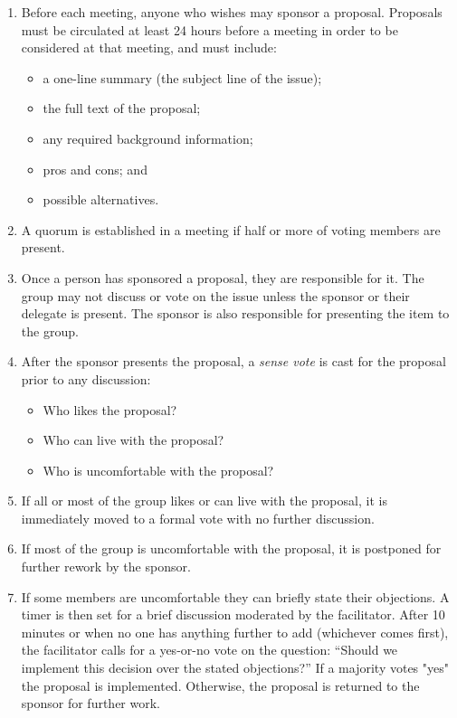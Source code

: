 \documentclass[10pt,letterpaper]{article}
\begin{document}
\begin{enumerate}

\item
  Before each meeting, anyone who wishes may sponsor a proposal.  Proposals must
  be circulated at least 24 hours before a meeting in order to be considered at
  that meeting, and must include:

  \begin{itemize}
  \item a one-line summary (the subject line of the issue);
  \item the full text of the proposal;
  \item any required background information;
  \item pros and cons; and
  \item possible alternatives.
  \end{itemize}

\item
  A quorum is established in a meeting if half or more of voting members are
  present.

\item
  Once a person has sponsored a proposal, they are responsible for it.  The
  group may not discuss or vote on the issue unless the sponsor or their
  delegate is present.  The sponsor is also responsible for presenting the item
  to the group.

\item
  After the sponsor presents the proposal, a \emph{sense vote} is cast for the
  proposal prior to any discussion:

  \begin{itemize}
  \item Who likes the proposal?
  \item Who can live with the proposal?
  \item Who is uncomfortable with the proposal?
  \end{itemize}

\item
  If all or most of the group likes or can live with the proposal, it is
  immediately moved to a formal vote with no further discussion.

\item
  If most of the group is uncomfortable with the proposal, it is postponed for
  further rework by the sponsor.

\item
  If some members are uncomfortable they can briefly state their objections.  A
  timer is then set for a brief discussion moderated by the facilitator.  After
  10 minutes or when no one has anything further to add (whichever comes first),
  the facilitator calls for a yes-or-no vote on the question: ``Should we
  implement this decision over the stated objections?''  If a majority votes
  "yes" the proposal is implemented.  Otherwise, the proposal is returned to the
  sponsor for further work.

\end{enumerate}
\end{document}
